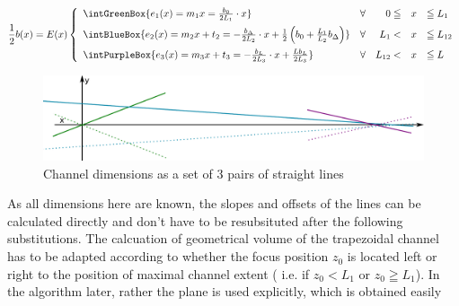 \begin{align}
  \frac{1}{2}b(x) = E(x) \left\{  
  \begin{array}{lcrcl}
    \intGreenBox {\ensuremath{ e_1(x) = m_1 x       = \frac{b_0}{2L_1} \cdot x   }}
    & \forall & 0 \leqq & x &\leqq L_1 \\\addlinespace %
    \intBlueBox {\ensuremath{ e_2(x) = m_2 x + t_2  = - \frac{\bDelta}{2 L_2} \cdot x  + \frac{1}{2} \left( b_0 +  \frac{L_1}{L_2}\bDelta \right)     }}
    & \forall & L_1 < & x &\leqq L_{12}  \\\addlinespace  %
    \intPurpleBox {\ensuremath{ e_3(x) = m_3 x + t_3  = - \frac{\bL}{2L_3}  \cdot x + \frac{L \bL}{2 L_3 } }}
    & \forall & L_{12} < & x &\leqq L   \\ %
  \end{array}
  \right.
  \label{eq:chLine}
\end{align}
\begin{figure}  
  \begin{center}
    \includegraphics[width=\linewidth]{./images/fffChannelCoordSys.pdf}    
  \end{center}
  \caption[Channel dimensions as a set of straight lines]{Channel dimensions as a set of 3 pairs of straight lines}
  \label{fig:fffChannelCoordSys} 
\end{figure}
As all dimensions here are known, the slopes and offsets of the lines can be calculated directly and don't have to be resubsituted after the following substitutions.
The calcuation of geometrical volume of the trapezoidal channel has to be adapted according to whether the focus 
position $z_0$ is located left or right to the position of maximal channel extent ( i.e. if $z_0 < L_1$ or $z_0 \geqq 
L_1$). In the algorithm later, rather the plane is used explicitly, which is obtained easily \clearpage
